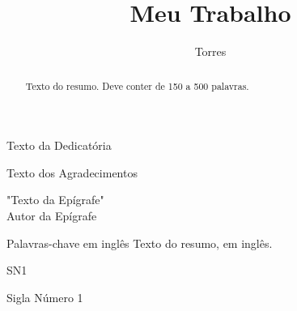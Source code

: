 \documentclass[tcc,capa,table]{textsi}
\title{Meu Trabalho}
\author{Torres}{Giovane de Oliveira}
\begin{document}


\maketitle 

\sloppy

\fichacatalografica
\folhadeaprovacao

\begin{dedicatoria}
	Texto da Dedicatória
\end{dedicatoria}

\begin{agradecimentos}
	Texto dos Agradecimentos
\end{agradecimentos}

\begin{epigrafe}
	"Texto da Epígrafe" \\
	Autor da Epígrafe
\end{epigrafe}

\begin{abstract}
	Texto do resumo. Deve conter de 150 a 500 palavras.
\end{abstract}

\begin{englishabstract}%
 	{Palavras-chave em inglês}
 	Texto do resumo, em inglês.
\end{englishabstract}

\listoffigures

\listoftables

\begin{listofabbrv}{SN1} %
	\item[SN1] Sigla Número 1
\end{listofabbrv}

\tableofcontents

\end{document}
